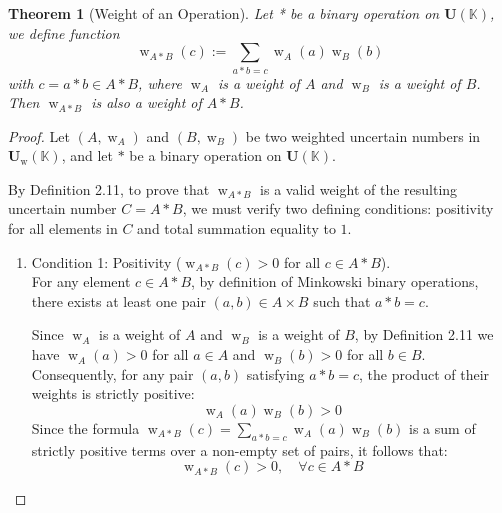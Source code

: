 \documentclass[a4paper,12pt, twoside]{memoir}
\newtheorem{theorem}{Theorem}[chapter]
\DeclareMathOperator{\w}{w}
\newcommand{\tsbd}[1]{\mathbf{U}(\mathbb{#1})}
\newcommand{\tsbdts}[1]{\mathbf{U}_{\w}(\mathbb{#1})} %
\newcommand{\ts}[1]{\w_{#1}} %
\begin{document}
\begin{theorem}[Weight of an Operation]
	Let * be a binary operation on $\tsbd{K}$, we define function
	$$\ts{A*B}(c) := \sum_{a*b=c}{\ts{A}(a)\ts{B}(b)}$$
	with $c = a * b \in A * B $, where $\ts{A}$ is a weight of $A$ and $\ts{B}$ is a weight of $B$. Then $\ts{A*B}$ is also a weight of $A *B $.
\end{theorem}
\begin{proof}
	Let $(A, \ts{A})$ and $(B, \ts{B})$ be two weighted uncertain numbers in $\tsbdts{K}$, and let $*$ be a binary operation on $\tsbd{K}$.

	By Definition 2.11, to prove that $\ts{A*B}$ is a valid weight of the resulting uncertain number $C = A * B$, we must verify two defining conditions: positivity for all elements in $C$ and total summation equality to $1$.

	\begin{enumerate}[leftmargin=*]
		\item Condition 1: Positivity ($\ts{A*B}(c) > 0$ for all $c \in A * B$). \\
		      For any element $c \in A * B$, by definition of Minkowski binary operations, there exists at least one pair $(a, b) \in A \times B$ such that $a * b = c$.

		      Since $\ts{A}$ is a weight of $A$ and $\ts{B}$ is a weight of $B$, by Definition 2.11 we have $\ts{A}(a) > 0$ for all $a \in A$ and $\ts{B}(b) > 0$ for all $b \in B$. Consequently, for any pair $(a, b)$ satisfying $a * b = c$, the product of their weights is strictly positive:
		      \[
			      \ts{A}(a) \ts{B}(b) > 0
		      \]
		      Since the formula $\ts{A*B}(c) = \sum_{a*b=c} \ts{A}(a)\ts{B}(b)$ is a sum of strictly positive terms over a non-empty set of pairs, it follows that:
		      \[
			      \ts{A*B}(c) > 0, \quad \forall c \in A * B
		      \]


\end{enumerate}
\end{proof}
\end{document}
